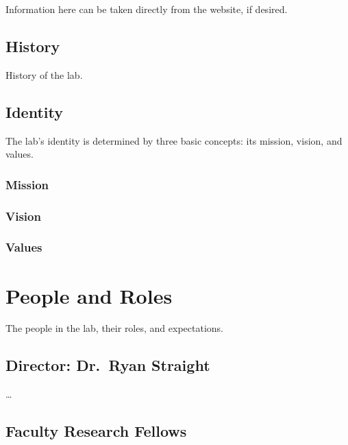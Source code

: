 \documentclass[
]{book}
\begin{document}
Information here can be taken directly from the website, if desired.

\hypertarget{history}{%
\section*{History}\label{history}}

History of the lab.

\hypertarget{identity}{%
\section*{Identity}\label{identity}}

The lab's identity is determined by three basic concepts: its mission, vision, and values.

\hypertarget{mission}{%
\subsection*{Mission}\label{mission}}

\hypertarget{vision}{%
\subsection*{Vision}\label{vision}}

\hypertarget{values}{%
\subsection*{Values}\label{values}}

\hypertarget{people}{%
\chapter{People and Roles}\label{people}}

The people in the lab, their roles, and expectations.

\hypertarget{director-dr.-ryan-straight}{%
\section{Director: Dr.~Ryan Straight}\label{director-dr.-ryan-straight}}

\ldots{}

\hypertarget{faculty-research-fellows}{%
\section{Faculty Research Fellows}\label{faculty-research-fellows}}
\end{document}
